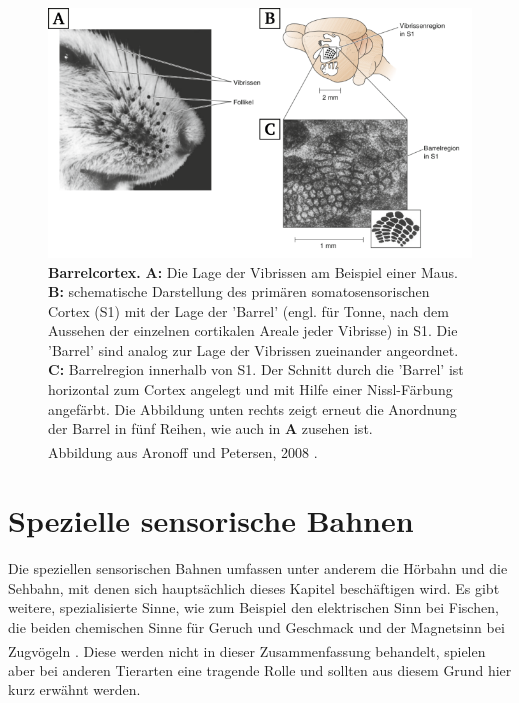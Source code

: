 \documentclass[12pt,a4paper,pdftex]{article}
\begin{document}
\begin{figure}[H]
    \centering
    \includegraphics[width = \textwidth] {pictures/somatosensory/barrelcortex.png}
    \caption[Barrelcortex]{\textbf{Barrelcortex.} \textbf{A:} Die Lage der Vibrissen am Beispiel einer Maus. \textbf{B:} schematische Darstellung des primären somatosensorischen Cortex (S1) mit der Lage der 'Barrel' (engl. für Tonne, nach dem Aussehen der einzelnen cortikalen Areale jeder Vibrisse) in S1. Die 'Barrel' sind analog zur Lage der Vibrissen zueinander angeordnet. \textbf{C:} Barrelregion innerhalb von S1. Der Schnitt durch die 'Barrel' ist horizontal zum Cortex angelegt und mit Hilfe einer Nissl-Färbung angefärbt. Die Abbildung unten rechts zeigt erneut die Anordnung der Barrel in fünf Reihen, wie auch in \textbf{A} zusehen ist. \\
    Abbildung aus Aronoff und Petersen, 2008 \textsuperscript{\cite{barrelcortex2008}}.}
    \label{fig:barrelcortex}
\end{figure}


\newpage
\section{Spezielle sensorische Bahnen}
\label{sec:spezsens}
Die speziellen sensorischen Bahnen umfassen unter anderem die Hörbahn  und die Sehbahn, mit denen sich hauptsächlich dieses Kapitel beschäftigen wird. Es gibt weitere, spezialisierte Sinne, wie zum Beispiel den elektrischen Sinn bei Fischen, die beiden chemischen Sinne für Geruch und Geschmack und der Magnetsinn bei Zugvögeln \textsuperscript{\cite{smith2008biology}}. Diese werden nicht in dieser Zusammenfassung behandelt, spielen aber bei anderen Tierarten eine tragende Rolle und sollten aus diesem Grund hier kurz erwähnt werden.
\end{document}
